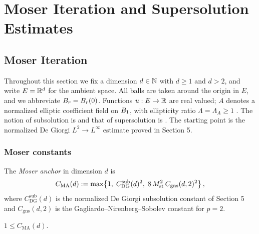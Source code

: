 \chapter{Moser Iteration and Supersolution Estimates}\label{sec:moser}


\section{Moser Iteration}

Throughout this section we fix a dimension $d \in \mathbb{N}$ with $d \geq 1$ and
$d > 2$, and write $E = \mathbb{R}^d$ for the ambient space. All balls are taken
around the origin in $E$, and we abbreviate $B_{r} = B_{r}(0)$. Functions
$u : E \to \mathbb{R}$ are real valued; $A$ denotes a normalized elliptic coefficient
field on $B_{1}$, with ellipticity ratio $\Lambda = \Lambda_A \geq 1$
. The notion of subsolution is
 and that of supersolution is
. The starting point is the normalized De Giorgi
$L^2 \to L^\infty$ estimate proved in Section 5.

\subsection{Moser constants}

\begin{definition}
\label{def:C_MoserAnchor}
\leanok
{}
The \emph{Moser anchor} in dimension $d$ is
\begin{equation*}
  C_{\mathrm{MA}}(d) := \max\!\left\{1,\;
    C_{\mathrm{DG}}^{\mathrm{sub}}(d)^{2},\;
    8\,M_{\mathrm{st}}^{2}\,C_{\mathrm{gns}}(d,2)^{2}\right\},
\end{equation*}
where $C_{\mathrm{DG}}^{\mathrm{sub}}(d)$ is the normalized De Giorgi
subsolution constant of Section 5 and $C_{\mathrm{gns}}(d,2)$ is the
Gagliardo--Nirenberg--Sobolev constant for $p=2$.
\end{definition}

\begin{lemma}
\label{lem:one_le_C_MoserAnchor}
\leanok
{}
$1 \leq C_{\mathrm{MA}}(d)$.
\end{lemma}

